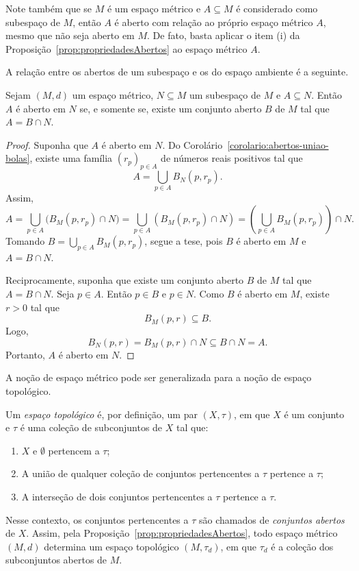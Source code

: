 Note também que se $M$ é um espaço métrico e $A\subseteq M$ é considerado como subespaço de $M$, então $A$ é aberto com relação ao próprio espaço métrico $A$, mesmo que não seja aberto em $M$.
De fato, basta aplicar o item (i) da Proposição~\ref{prop:propriedadesAbertos} ao espaço métrico $A$.

A relação entre os abertos de um subespaço e os do espaço ambiente é a seguinte.

\begin{proposition}
    Sejam $(M,d)$ um espaço métrico, $N\subseteq M$ um subespaço de $M$ e $A\subseteq N$.
    Então $A$ é aberto em $N$ se, e somente se, existe um conjunto aberto $B$ de $M$ tal que $A=B\cap N$.
\end{proposition}
\begin{proof}
    Suponha que $A$ é aberto em $N$.
    Do Corolário~\ref{corolario:abertos-uniao-bolas}, existe uma família $(r_p)_{p\in A}$ de números reais positivos tal que
    \[
        A = \bigcup_{p\in A} B_N(p, r_p).
    \]
    Assim,
    \[
        A = \bigcup_{p\in A} \bigl(B_M(p, r_p)\cap N\bigr) = \bigcup_{p\in A} \left(B_M(p, r_p)\cap N\right) = \left(\bigcup_{p\in A} B_M(p, r_p)\right)\cap N.
    \]
    Tomando $B = \bigcup_{p\in A} B_M(p, r_p)$, segue a tese, pois $B$ é aberto em $M$ e $A = B\cap N$.

    Reciprocamente, suponha que existe um conjunto aberto $B$ de $M$ tal que $A=B\cap N$.
    Seja $p\in A$.
    Então $p\in B$ e $p\in N$.
    Como $B$ é aberto em $M$, existe $r>0$ tal que
    \[
        B_M(p,r)\subseteq B.
    \]
    Logo,
    \[
        B_N(p,r)=B_M(p,r)\cap N\subseteq B\cap N=A.
    \]
    Portanto, $A$ é aberto em $N$.
\end{proof}

\begin{knowMore}
    A noção de espaço métrico pode ser generalizada para a noção de espaço topológico.

    Um \emph{espaço topológico} é, por definição, um par $(X, \tau)$, em que $X$ é um conjunto e $\tau$ é uma coleção de subconjuntos de $X$ tal que:
    \begin{enumerate}[label=(\roman*)]
        \item $X$ e $\emptyset$ pertencem a $\tau$;
        \item A união de qualquer coleção de conjuntos pertencentes a $\tau$ pertence a $\tau$;
        \item A interseção de dois conjuntos pertencentes a $\tau$ pertence a $\tau$.
    \end{enumerate}
    Nesse contexto, os conjuntos pertencentes a $\tau$ são chamados de \emph{conjuntos abertos} de $X$.
    Assim, pela Proposição~\ref{prop:propriedadesAbertos}, todo espaço métrico $(M,d)$ determina um espaço topológico $(M,\tau_d)$, em que $\tau_d$ é a coleção dos subconjuntos abertos de $M$.
\end{knowMore}

